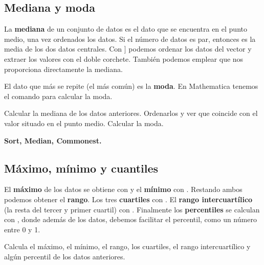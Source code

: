 \documentclass[a4paper,10pt, draft]{article}
\newcommand{\com}[1]{\textbf{\color{blue}{#1}}}
\newenvironment{ejer}{\begin{tcolorbox}[center title, title=Ejercicios,
fonttitle=\sffamily\bfseries,colback=blue!5,colframe=orange]}{\end{tcolorbox}}
\newenvironment{funciones}{\begin{tcolorbox}[center title, title=Nuevas funciones, fonttitle=\sffamily\bfseries, colback=green!5!white,colframe=red!75!black]}{\end{tcolorbox}\bigskip}
\begin{document}
 \newpage


\subsection{Mediana y moda}

La \textbf{mediana} de un conjunto de datos es el dato que se encuentra en el punto medio, una vez ordenados los datos. Si el número de datos es par, entonces es la media de los dos datos centrales. Con \com{Sort[v}] podemos ordenar los datos del vector y extraer los valores con el doble corchete. También podemos emplear \com{Median[v]} que nos proporciona directamente la mediana. 

El dato que más se repite (el más común) es la \textbf{moda}. En Mathematica tenemos el comando \com{Commonest[v]} para calcular la moda.

\begin{ejer}

Calcular la mediana de los datos anteriores. Ordenarlos y ver que coincide con el valor situado en el punto medio. Calcular la moda.

\end{ejer}  

\begin{funciones}


\textbf{Sort, Median, Commonest.}


\end{funciones}




\newpage

\subsection{Máximo, mínimo y cuantiles}

El \textbf{máximo} de los datos se obtiene con \com{Max[v]} y el \textbf{mínimo} con \com{Min[v]}. Restando ambos podemos obtener el \textbf{rango}. Los tres \textbf{cuartiles} con \com{Quartiles[v]}. El \textbf{rango intercuartílico} (la resta del tercer y primer cuartil) con \com{InterquartileRange[v]}. Finalmente los \textbf{percentiles} se calculan con \com{Quantile[v,p]}, donde además de los datos, debemos facilitar el percentil, como un número entre 0 y 1.


\begin{ejer}

Calcula el máximo, el mínimo, el rango, los cuartiles, el rango intercuartílico y algún percentil de los datos anteriores.

\end{ejer} 
\end{document}

